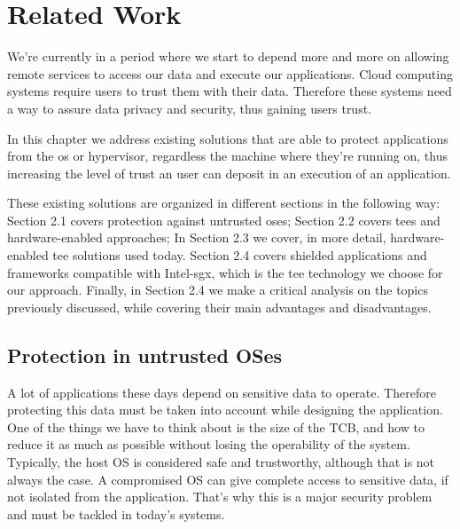\chapter{Related Work}
\label{cha:related_work}

We’re currently in a period where we start to depend more and more on allowing remote services to access our data and execute our applications. Cloud computing systems require users to trust them with their data. Therefore these systems need a way to assure data privacy
and security, thus gaining users trust.

In this chapter we address existing solutions that are able to protect applications from the \gls{os} or hypervisor, regardless the machine where they're running on, thus increasing the level of trust an user can deposit in an execution of an application.

These existing solutions are organized in different sections in the following way: 
Section 2.1 covers protection against untrusted \gls{os}es; 
Section 2.2 covers \gls{tee}s and hardware-enabled approaches;
In Section 2.3 we cover, in more detail, hardware-enabled \gls{tee} solutions used today.
Section 2.4 covers shielded applications and frameworks compatible with Intel-\gls{sgx}, which is the \gls{tee} technology we choose for our approach.
Finally, in Section 2.4 we make a critical analysis on the topics previously discussed, while covering their main advantages and disadvantages.




\section{Protection in untrusted OSes}

A lot of applications these days depend on sensitive data to operate. Therefore protecting this data must be taken into account while designing the application. 
One of the things we have to think about is the size of the TCB, and how to reduce it as much as possible without losing the operability of the system. 
Typically, the host OS is considered safe and trustworthy, although that is not always the case. A compromised OS can give complete access to sensitive data, if not isolated from the application. That’s why this is a major security problem and must be tackled in today’s systems.

